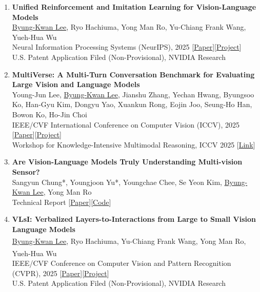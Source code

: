 \documentclass[a4paper,11pt]{article}
\begin{document}
{\begin{enumerate}[leftmargin=2.2em, labelsep=0.6em, align=left, itemindent=0em, label={\color{accentDark}\textbf{\arabic*.}}]
\item \textbf{Unified Reinforcement and Imitation Learning for Vision-Language Models}
\\\vspace{1mm}\underline{Byung-Kwan Lee}, Ryo Hachiuma, Yong Man Ro, Yu-Chiang Frank Wang, Yueh-Hua Wu
\\\vspace{2mm}Neural Information Processing Systems (NeurIPS), 2025 [\href{https://arxiv.org/abs/2510.19307}{Paper}][\href{https://byungkwanlee.github.io/RIL-page/}{Project}]
\\\vspace{2mm}U.S. Patent Application Filed (Non-Provisional), NVIDIA Research

\item \textbf{MultiVerse: A Multi-Turn Conversation Benchmark for Evaluating Large Vision and Language Models}
\\\vspace{1mm}Young-Jun Lee, \underline{Byung-Kwan Lee}, Jianshu Zhang, Yechan Hwang, Byungsoo Ko, Han-Gyu Kim, Dongyu Yao, Xuankun Rong, Eojin Joo, Seung-Ho Han, Bowon Ko, Ho-Jin Choi
\\\vspace{2mm}IEEE/CVF International Conference on Computer Vision (ICCV), 2025 [\href{https://www.arxiv.org/abs/2510.16641}{Paper}][\href{https://passing2961.github.io/multiverse-project-page/}{Project}]
\\\vspace{2mm}Workshop for Knowledge-Intensive Multimodal Reasoning, ICCV 2025 [\href{https://knowledgemr-workshop.github.io/}{Link}]

\item \textbf{Are Vision-Language Models Truly Understanding Multi-vision Sensor?}
\\\vspace{1mm}Sangyun Chung*, Youngjoon Yu*, Youngchae Chee, Se Yeon Kim, \underline{Byung-Kwan Lee}, Yong Man Ro
\\\vspace{2mm}Technical Report [\href{https://arxiv.org/abs/2412.20750v1}{Paper}][\href{https://github.com/top-yun/VS-TDX}{Code}]

\item \textbf{VLsI: Verbalized Layers-to-Interactions from Large to Small Vision Language Models}
\\\vspace{1mm}\underline{Byung-Kwan Lee}, Ryo Hachiuma, Yu-Chiang Frank Wang, Yong Man Ro\textsuperscript{\dag}, Yueh-Hua Wu\textsuperscript{\dag}
\\\vspace{2mm}IEEE/CVF Conference on Computer Vision and Pattern Recognition (CVPR), 2025 [\href{https://arxiv.org/abs/2412.01822}{Paper}][\href{https://byungkwanlee.github.io/VLsI-page/}{Project}]
\\\vspace{2mm}U.S. Patent Application Filed (Non-Provisional), NVIDIA Research


\end{enumerate}}
\end{document}
